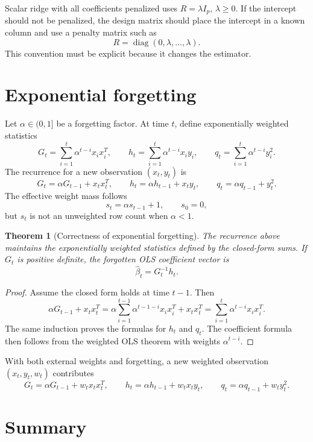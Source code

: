 \documentclass[11pt]{article}
\newtheorem{theorem}{Theorem}
\begin{document}
Scalar ridge with all coefficients penalized uses \(R=\lambda I_p\),
\(\lambda\ge 0\).  If the intercept should not be penalized, the design
matrix should place the intercept in a known column and use a penalty
matrix such as
\[
  R=\operatorname{diag}(0,\lambda,\ldots,\lambda).
\]
This convention must be explicit because it changes the estimator.

\section{Exponential forgetting}

Let \(\alpha \in (0,1]\) be a forgetting factor.  At time \(t\), define
exponentially weighted statistics
\[
  G_t = \sum_{i=1}^t \alpha^{t-i}x_i x_i^T,\qquad
  h_t = \sum_{i=1}^t \alpha^{t-i}x_i y_i,\qquad
  q_t = \sum_{i=1}^t \alpha^{t-i}y_i^2 .
\]
The recurrence for a new observation \((x_t,y_t)\) is
\[
  G_t = \alpha G_{t-1} + x_t x_t^T,\qquad
  h_t = \alpha h_{t-1} + x_t y_t,\qquad
  q_t = \alpha q_{t-1} + y_t^2 .
\]
The effective weight mass follows
\[
  s_t = \alpha s_{t-1}+1,\qquad s_0=0,
\]
but \(s_t\) is not an unweighted row count when \(\alpha<1\).

\begin{theorem}[Correctness of exponential forgetting]
The recurrence above maintains the exponentially weighted statistics
defined by the closed-form sums.  If \(G_t\) is positive definite, the
forgotten OLS coefficient vector is
\[
  \widehat{\beta}_t = G_t^{-1}h_t .
\]
\end{theorem}

\begin{proof}
Assume the closed form holds at time \(t-1\).  Then
\[
  \alpha G_{t-1} + x_t x_t^T
  =
  \alpha \sum_{i=1}^{t-1} \alpha^{t-1-i}x_i x_i^T + x_t x_t^T
  =
  \sum_{i=1}^{t} \alpha^{t-i}x_i x_i^T .
\]
The same induction proves the formulas for \(h_t\) and \(q_t\).  The
coefficient formula then follows from the weighted OLS theorem with
weights \(\alpha^{t-i}\).
\end{proof}

With both external weights and forgetting, a new weighted observation
\((x_t,y_t,w_t)\) contributes
\[
  G_t = \alpha G_{t-1} + w_t x_t x_t^T,\qquad
  h_t = \alpha h_{t-1} + w_t x_t y_t,\qquad
  q_t = \alpha q_{t-1} + w_t y_t^2 .
\]

\section{Summary}
\end{document}
